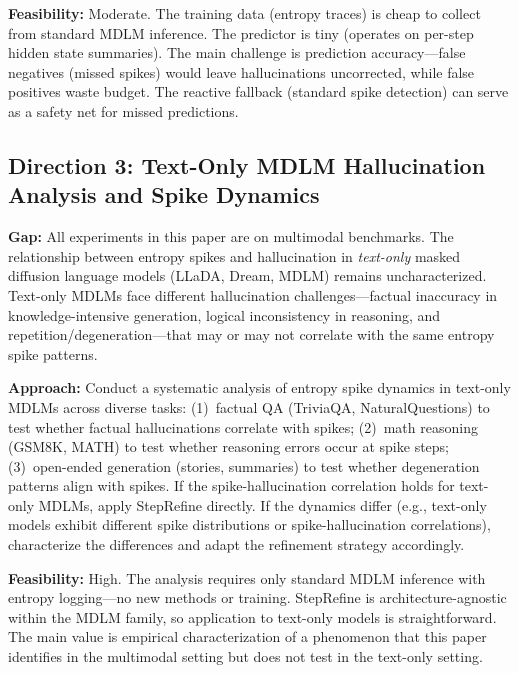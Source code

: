 \documentclass[11pt,a4paper]{article}
\begin{document}
\textbf{Feasibility:} Moderate. The training data (entropy traces) is cheap to collect from standard MDLM inference. The predictor is tiny (operates on per-step hidden state summaries). The main challenge is prediction accuracy---false negatives (missed spikes) would leave hallucinations uncorrected, while false positives waste budget. The reactive fallback (standard spike detection) can serve as a safety net for missed predictions.

\subsection{Direction 3: Text-Only MDLM Hallucination Analysis and Spike Dynamics}
\textbf{Gap:} All experiments in this paper are on multimodal benchmarks. The relationship between entropy spikes and hallucination in \emph{text-only} masked diffusion language models (LLaDA, Dream, MDLM) remains uncharacterized. Text-only MDLMs face different hallucination challenges---factual inaccuracy in knowledge-intensive generation, logical inconsistency in reasoning, and repetition/degeneration---that may or may not correlate with the same entropy spike patterns.

\textbf{Approach:} Conduct a systematic analysis of entropy spike dynamics in text-only MDLMs across diverse tasks: (1)~factual QA (TriviaQA, NaturalQuestions) to test whether factual hallucinations correlate with spikes; (2)~math reasoning (GSM8K, MATH) to test whether reasoning errors occur at spike steps; (3)~open-ended generation (stories, summaries) to test whether degeneration patterns align with spikes. If the spike-hallucination correlation holds for text-only MDLMs, apply StepRefine directly. If the dynamics differ (e.g., text-only models exhibit different spike distributions or spike-hallucination correlations), characterize the differences and adapt the refinement strategy accordingly.

\textbf{Feasibility:} High. The analysis requires only standard MDLM inference with entropy logging---no new methods or training. StepRefine is architecture-agnostic within the MDLM family, so application to text-only models is straightforward. The main value is empirical characterization of a phenomenon that this paper identifies in the multimodal setting but does not test in the text-only setting.
\end{document}
